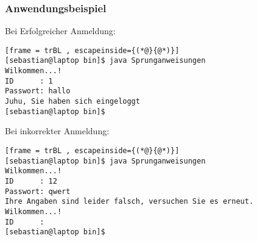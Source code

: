 \subsubsection{Anwendungsbeispiel}
Bei Erfolgreicher Anmeldung:
\begin{lstlisting}[frame = trBL , escapeinside={(*@}{@*)}]
[sebastian@laptop bin]$ java Sprunganweisungen 	
Wilkommen...!
ID      : 1
Passwort: hallo
Juhu, Sie haben sich eingeloggt
[sebastian@laptop bin]$ 
\end{lstlisting}
Bei inkorrekter Anmeldung:
\begin{lstlisting}[frame = trBL , escapeinside={(*@}{@*)}]
[sebastian@laptop bin]$ java Sprunganweisungen 	
Wilkommen...!
ID      : 12
Passwort: qwert
Ihre Angaben sind leider falsch, versuchen Sie es erneut.
Wilkommen...!
ID      : 
[sebastian@laptop bin]$ 
\end{lstlisting}